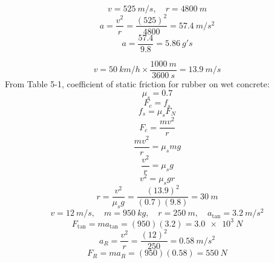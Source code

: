 \documentclass[11pt]{homework}
\begin{document}
\setcounter{questionCounter}{37}
\question
\[
    v = \qty{525}{m/s}, \quad r = \qty{4800}{m}
\]
\[
    a = \frac{v^2}{r} = \frac{(525)^2}{4800} = \qty{57.4}{m/s^2}
\]
\[
    a = \frac{57.4}{9.8} = \boxed{\qty{5.86}{g's}}
\]

\setcounter{questionCounter}{44}
\question
\[
    v = \qty{50}{km/h} \times \frac{\qty{1000}{m}}{\qty{3600}{s}} = \qty{13.9}{m/s}
\]
From Table 5-1, coefficient of static friction for rubber on wet concrete:
\[
\mu_s = 0.7
\]
\[
F_c = f_s
\]
\[
f_s = \mu_sF_N
\]
\[
F_c = \frac{mv^2}{r}
\]
\[
\frac{mv^2}{r} = \mu_smg 
\]
\[
\frac{v^2}{r}=\mu_sg 
\]
\[
v^2= \mu_sgr
\]
\[
    r = \frac{v^2}{\mu_sg} = \frac{(13.9)^2}{(0.7)(9.8)} = \boxed{\qty{30}{m}} 
\]
\setcounter{questionCounter}{64}
\question
\[
    v = \qty{12}{m/s}, \quad m = \qty{950}{kg}, \quad r = \qty{250}{m}, \quad a_{\tan} = \qty{3.2}{m/s^2}
\]
\[
    F_{\tan} = ma_{\tan} = (950)(3.2) = \boxed{\qty{3.0e3}{N}}
\]
\[
    a_R = \frac{v^2}{r} = \frac{(12)^2}{250} = \qty{0.58}{m/s^2}
\]
\[
    F_{R} = ma_R = (950)(0.58) = \boxed{\qty{550}{N}}
\]
\end{document}
